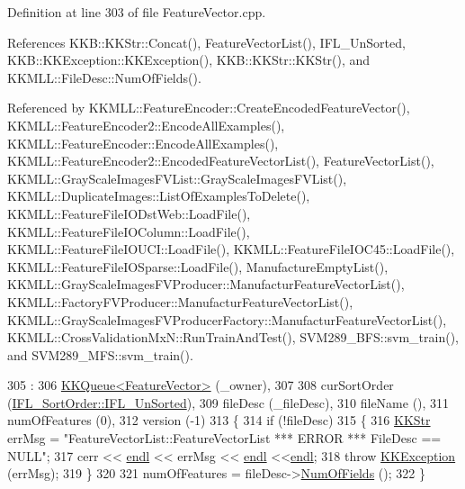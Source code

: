 Definition at line 303 of file Feature\+Vector.\+cpp.



References K\+K\+B\+::\+K\+K\+Str\+::\+Concat(), Feature\+Vector\+List(), I\+F\+L\+\_\+\+Un\+Sorted, K\+K\+B\+::\+K\+K\+Exception\+::\+K\+K\+Exception(), K\+K\+B\+::\+K\+K\+Str\+::\+K\+K\+Str(), and K\+K\+M\+L\+L\+::\+File\+Desc\+::\+Num\+Of\+Fields().



Referenced by K\+K\+M\+L\+L\+::\+Feature\+Encoder\+::\+Create\+Encoded\+Feature\+Vector(), K\+K\+M\+L\+L\+::\+Feature\+Encoder2\+::\+Encode\+All\+Examples(), K\+K\+M\+L\+L\+::\+Feature\+Encoder\+::\+Encode\+All\+Examples(), K\+K\+M\+L\+L\+::\+Feature\+Encoder2\+::\+Encoded\+Feature\+Vector\+List(), Feature\+Vector\+List(), K\+K\+M\+L\+L\+::\+Gray\+Scale\+Images\+F\+V\+List\+::\+Gray\+Scale\+Images\+F\+V\+List(), K\+K\+M\+L\+L\+::\+Duplicate\+Images\+::\+List\+Of\+Examples\+To\+Delete(), K\+K\+M\+L\+L\+::\+Feature\+File\+I\+O\+Dst\+Web\+::\+Load\+File(), K\+K\+M\+L\+L\+::\+Feature\+File\+I\+O\+Column\+::\+Load\+File(), K\+K\+M\+L\+L\+::\+Feature\+File\+I\+O\+U\+C\+I\+::\+Load\+File(), K\+K\+M\+L\+L\+::\+Feature\+File\+I\+O\+C45\+::\+Load\+File(), K\+K\+M\+L\+L\+::\+Feature\+File\+I\+O\+Sparse\+::\+Load\+File(), Manufacture\+Empty\+List(), K\+K\+M\+L\+L\+::\+Gray\+Scale\+Images\+F\+V\+Producer\+::\+Manufactur\+Feature\+Vector\+List(), K\+K\+M\+L\+L\+::\+Factory\+F\+V\+Producer\+::\+Manufactur\+Feature\+Vector\+List(), K\+K\+M\+L\+L\+::\+Gray\+Scale\+Images\+F\+V\+Producer\+Factory\+::\+Manufactur\+Feature\+Vector\+List(), K\+K\+M\+L\+L\+::\+Cross\+Validation\+Mx\+N\+::\+Run\+Train\+And\+Test(), S\+V\+M289\+\_\+\+B\+F\+S\+::svm\+\_\+train(), and S\+V\+M289\+\_\+\+M\+F\+S\+::svm\+\_\+train().


\begin{DoxyCode}
305                                       :
306   \hyperlink{class_k_k_b_1_1_k_k_queue}{KKQueue<FeatureVector>} (\_owner),
307 
308   curSortOrder  (\hyperlink{class_k_k_m_l_l_1_1_feature_vector_list_a24e87fc6e8ca10537dbcd275bb339a3ca0e3e88ff557d4664b67de1a03649c67a}{IFL\_SortOrder::IFL\_UnSorted}),
309   fileDesc      (\_fileDesc),
310   fileName      (),
311   numOfFeatures (0),
312   version       (-1)
313 \{
314   \textcolor{keywordflow}{if}  (!fileDesc)
315   \{
316     \hyperlink{class_k_k_b_1_1_k_k_str}{KKStr}  errMsg = \textcolor{stringliteral}{"FeatureVectorList::FeatureVectorList    *** ERROR ***      FileDesc == NULL"};
317     cerr << \hyperlink{namespace_k_k_b_ad1f50f65af6adc8fa9e6f62d007818a8}{endl} << errMsg << \hyperlink{namespace_k_k_b_ad1f50f65af6adc8fa9e6f62d007818a8}{endl} <<\hyperlink{namespace_k_k_b_ad1f50f65af6adc8fa9e6f62d007818a8}{endl};
318     \textcolor{keywordflow}{throw} \hyperlink{class_k_k_b_1_1_k_k_exception}{KKException} (errMsg);
319   \}
320 
321   numOfFeatures = fileDesc->\hyperlink{class_k_k_m_l_l_1_1_file_desc_a07abdfb77949dee565c555c7651581c2}{NumOfFields} ();
322 \}
\end{DoxyCode}
